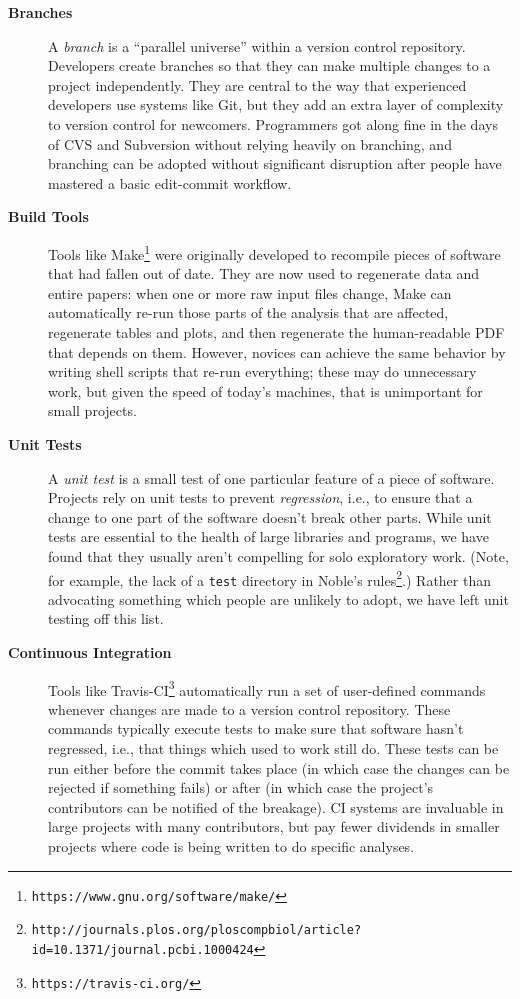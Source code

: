 \documentclass[10pt]{article}
\newcommand{\withurl}[2]{{#1}\footnote{\texttt{#2}}}
\begin{document}
\begin{description}

\item[\textbf{Branches}]
A \emph{branch} is a ``parallel universe'' within a version control
repository. Developers create branches so that they can make multiple
changes to a project independently. They are central to the way that
experienced developers use systems like Git, but they add an extra layer
of complexity to version control for newcomers. Programmers got along
fine in the days of CVS and Subversion without relying heavily on
branching, and branching can be adopted without significant disruption
after people have mastered a basic edit-commit workflow.

\item[\textbf{Build Tools}] Tools like
  \withurl{Make}{https://www.gnu.org/software/make/} were originally
  developed to recompile pieces of software that had fallen out of
  date. They are now used to regenerate data and entire papers: when
  one or more raw input files change, Make can automatically re-run
  those parts of the analysis that are affected, regenerate tables and
  plots, and then regenerate the human-readable PDF that depends on
  them.  However, novices can achieve the same behavior by writing
  shell scripts that re-run everything; these may do unnecessary work,
  but given the speed of today's machines, that is unimportant for
  small projects.

\item[\textbf{Unit Tests}] A \emph{unit test} is a small test of one
  particular feature of a piece of software. Projects rely on unit
  tests to prevent \emph{regression}, i.e., to ensure that a change to
  one part of the software doesn't break other parts. While unit tests
  are essential to the health of large libraries and programs, we have
  found that they usually aren't compelling for solo exploratory
  work. (Note, for example, the lack of a \texttt{test} directory in
  \withurl{Noble's
    rules}{http://journals.plos.org/ploscompbiol/article?id=10.1371/journal.pcbi.1000424}.)
  Rather than advocating something which people are unlikely to adopt,
  we have left unit testing off this list.

\item[\textbf{Continuous Integration}] Tools like
  \withurl{Travis-CI}{https://travis-ci.org/} automatically run a set of
  user-defined commands whenever changes are made to a version control
  repository. These commands typically execute tests to make sure that
  software hasn't regressed, i.e., that things which used to work
  still do. These tests can be run either before the commit takes
  place (in which case the changes can be rejected if something fails)
  or after (in which case the project's contributors can be notified
  of the breakage). CI systems are invaluable in large projects with
  many contributors, but pay fewer dividends in smaller projects where
  code is being written to do specific analyses.


\end{description}
\end{document}
